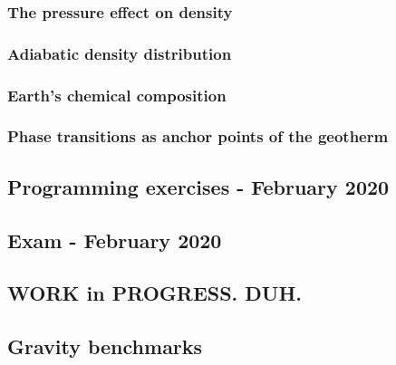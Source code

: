 \documentclass[a4paper]{article}
\numberwithin{equation}{section}
\begin{document}
\subsubsection{The pressure effect on density} %
\label{Pressure_density}  %
\subsubsection{Adiabatic density distribution} %
\label{Adiabatic density distribution}  %
\subsubsection{Earth's chemical composition} %
\label{section-chemical-composition}  %
\subsubsection{Phase transitions as anchor points of the geotherm} %
\label{section-anchor points}  %

\subsection{Programming exercises - February 2020} 
\subsection{Exam - February 2020} 

\newpage
\subsection{WORK in PROGRESS. DUH.} %

\subsection{Gravity benchmarks} 
\end{document}
